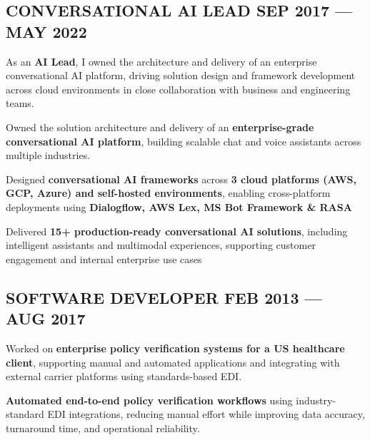 \subsection{CONVERSATIONAL AI LEAD \hfill \color{highlight} SEP 2017 --- MAY 2022}
\vspace{0.6em}
As an \textbf{AI Lead}, I owned the architecture and delivery of an enterprise conversational AI platform, driving solution design and framework development across cloud environments in close collaboration with business and engineering teams.
\begin{zitemize}
    \item Owned the solution architecture and delivery of an \textbf{enterprise-grade conversational AI platform}, building scalable chat and voice assistants across multiple industries.
    \item Designed \textbf{conversational AI frameworks} across \textbf{3 cloud platforms (AWS, GCP, Azure) and self-hosted environments}, enabling cross-platform deployments using \textbf{Dialogflow, AWS Lex, MS Bot Framework \& RASA}
    \item Delivered \textbf{15+ production-ready conversational AI solutions}, including intelligent assistants and multimodal experiences, supporting customer engagement and internal enterprise use cases
\end{zitemize}
\vspace{0.3em}

\subsection{SOFTWARE DEVELOPER \hfill \color{highlight} FEB 2013 --- AUG 2017}
\vspace{0.6em}
Worked on \textbf{enterprise policy verification systems for a US healthcare client}, supporting manual and automated applications and integrating with external carrier platforms using standards-based EDI.
\begin{zitemize}
    \item \textbf{Automated end-to-end policy verification workflows} using industry-standard EDI integrations, reducing manual effort while improving data accuracy, turnaround time, and operational reliability.
\end{zitemize}